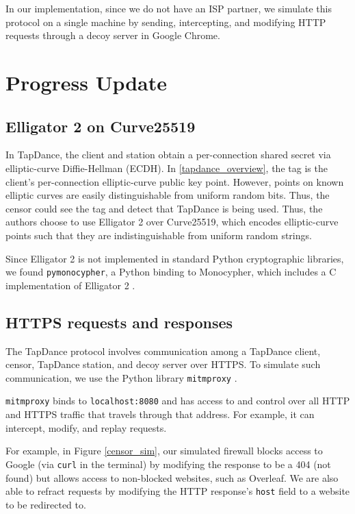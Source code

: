 \documentclass[conference]{IEEEtran}
\begin{document}
In our implementation, since we do not have an ISP partner, we simulate this protocol on a single machine by sending, intercepting, and modifying HTTP requests through a decoy server in Google Chrome.

\section{Progress Update}

\subsection{Elligator 2 on Curve25519}

In TapDance, the client and station obtain a per-connection shared secret via elliptic-curve Diffie-Hellman (ECDH). In \ref{tapdance_overview}, the tag is the client's per-connection elliptic-curve public key point. However, points on known elliptic curves are easily distinguishable from uniform random bits. Thus, the censor could see the tag and detect that TapDance is being used. Thus, the authors choose to use Elligator 2 over Curve25519, which encodes elliptic-curve points such that they are indistinguishable from uniform random strings.

Since Elligator 2 is not implemented in standard Python cryptographic libraries, we found \texttt{pymonocypher}, a Python binding to Monocypher, which includes a C implementation of Elligator 2 \cite{pymonocypher}.

\subsection{HTTPS requests and responses}

The TapDance protocol involves communication among a TapDance client, censor, TapDance station, and decoy server over HTTPS. To simulate such communication, we use the Python library \texttt{mitmproxy} \cite{mitmproxy}.

\texttt{mitmproxy} binds to \texttt{localhost:8080} and has access to and control over all HTTP and HTTPS traffic that travels through that address. For example, it can intercept, modify, and replay requests.

For example, in Figure \ref{censor_sim}, our simulated firewall blocks access to Google (via \texttt{curl} in the terminal) by modifying the response to be a 404 (not found) but allows access to non-blocked websites, such as Overleaf. We are also able to refract requests by modifying the HTTP response's \texttt{host} field to a website to be redirected to.
\end{document}
